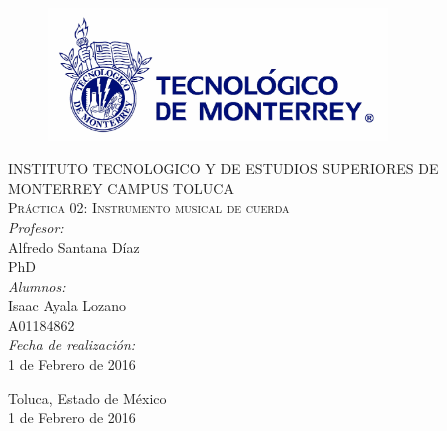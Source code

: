 \begin{titlepage}
\begin{center}
\begin{figure}[!htbp]
\centering
\includegraphics[width=90mm]{./img/logo_itesm.jpg}
\end{figure}


\textsc{ INSTITUTO TECNOLOGICO Y DE ESTUDIOS SUPERIORES DE MONTERREY
CAMPUS TOLUCA}\\[1.5cm]

\textsc{ Pr\'actica 02: Instrumento musical de cuerda}\\[0.5cm]


\emph{Profesor:}\\
 Alfredo Santana D\'iaz\\
 PhD\\
 \medskip
\emph{Alumnos:} \\
Isaac Ayala Lozano\\A01184862\\
 \medskip
\emph{Fecha de realizaci\'on:}\\
1 de Febrero de 2016\\
\vfill


{\large
Toluca, Estado de M\'exico\\
1 de Febrero de 2016
}

\end{center}
\end{titlepage}
